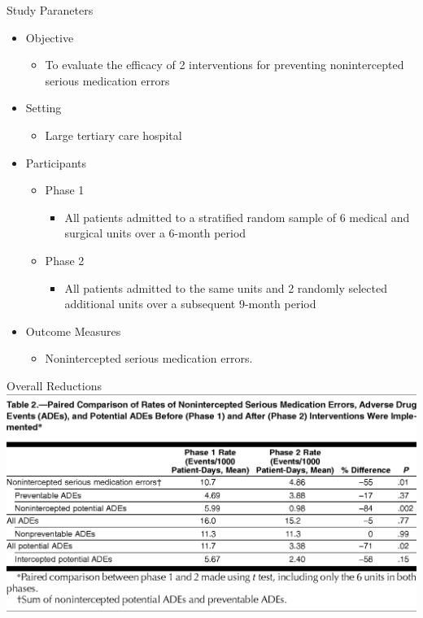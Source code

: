 \documentclass[10pt]{beamer}
\begin{document}
\begin{frame}{Study Paraneters}
	\begin{itemize}
		\item Objective
		\begin{itemize}
			\item To evaluate the efficacy of 2 interventions for preventing nonintercepted serious medication errors
		\end{itemize}
		\item Setting
		\begin{itemize}
			\item Large tertiary care hospital
		\end{itemize}
		\item Participants
		\begin{itemize}
			\item Phase 1 
			\begin{itemize}
				\item All patients admitted to a stratified random sample of 6 medical and surgical units over a 6-month period
			\end{itemize}
			\item Phase 2  
			\begin{itemize}
				\item All patients admitted to the same units and 2 randomly selected additional units over a subsequent 9-month period
			\end{itemize}
		\end{itemize}
		\item Outcome Measures
		\begin{itemize}
			\item Nonintercepted serious medication errors.
		\end{itemize}
		
	\end{itemize}
\end{frame}


\begin{frame}{Overall Reductions}
	\includegraphics[width=1\textwidth]{images/jama2.png}
\end{frame}
\end{document}
